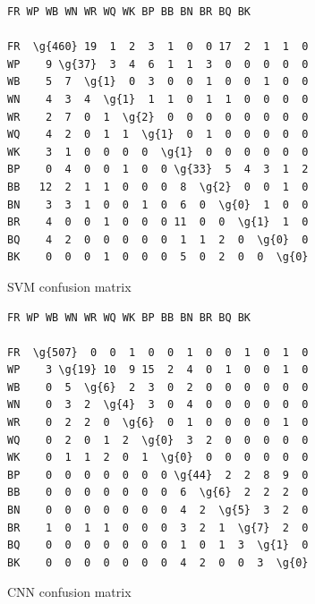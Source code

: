\begin{figure}[h]
    \centering
    \begin{BVerbatim}[fontsize=\scriptsize,commandchars=\\\{\}]
    FR WP WB WN WR WQ WK BP BB BN BR BQ BK

FR  \g{460} 19  1  2  3  1  0  0 17  2  1  1  0
WP    9 \g{37}  3  4  6  1  1  3  0  0  0  0  0
WB    5  7  \g{1}  0  3  0  0  1  0  0  1  0  0
WN    4  3  4  \g{1}  1  1  0  1  1  0  0  0  0
WR    2  7  0  1  \g{2}  0  0  0  0  0  0  0  0
WQ    4  2  0  1  1  \g{1}  0  1  0  0  0  0  0
WK    3  1  0  0  0  0  \g{1}  0  0  0  0  0  0
BP    0  4  0  0  1  0  0 \g{33}  5  4  3  1  2
BB   12  2  1  1  0  0  0  8  \g{2}  0  0  1  0
BN    3  3  1  0  0  1  0  6  0  \g{0}  1  0  0
BR    4  0  0  1  0  0  0 11  0  0  \g{1}  1  0
BQ    4  2  0  0  0  0  0  1  1  2  0  \g{0}  0
BK    0  0  0  1  0  0  0  5  0  2  0  0  \g{0}
    \end{BVerbatim}
    \caption{SVM confusion matrix}
    \label{ver:svm-confusion-matrix}
\end{figure}

\begin{figure}[h]
    \centering
    \begin{BVerbatim}[fontsize=\scriptsize,commandchars=\\\{\}]
    FR WP WB WN WR WQ WK BP BB BN BR BQ BK

FR  \g{507}  0  0  1  0  0  1  0  0  1  0  1  0
WP    3 \g{19} 10  9 15  2  4  0  1  0  0  1  0
WB    0  5  \g{6}  2  3  0  2  0  0  0  0  0  0
WN    0  3  2  \g{4}  3  0  4  0  0  0  0  0  0
WR    0  2  2  0  \g{6}  0  1  0  0  0  0  1  0
WQ    0  2  0  1  2  \g{0}  3  2  0  0  0  0  0
WK    0  1  1  2  0  1  \g{0}  0  0  0  0  0  0
BP    0  0  0  0  0  0  0 \g{44}  2  2  8  9  0
BB    0  0  0  0  0  0  0  6  \g{6}  2  2  2  0
BN    0  0  0  0  0  0  0  4  2  \g{5}  3  2  0
BR    1  0  1  1  0  0  0  3  2  1  \g{7}  2  0
BQ    0  0  0  0  0  0  0  1  0  1  3  \g{1}  0
BK    0  0  0  0  0  0  0  4  2  0  0  3  \g{0}
    \end{BVerbatim}
    \caption{CNN confusion matrix}
    \label{ver:cnn-confusion-matrix}
\end{figure}

